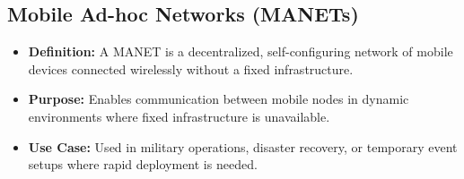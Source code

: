 \subsection{Mobile Ad-hoc Networks (MANETs)}
\begin{itemize}[leftmargin=1.5cm]
  \item \textbf{Definition:} A MANET is a decentralized, self-configuring network of mobile devices connected wirelessly without a fixed infrastructure.
  \item \textbf{Purpose:} Enables communication between mobile nodes in dynamic environments where fixed infrastructure is unavailable.
  \item \textbf{Use Case:} Used in military operations, disaster recovery, or temporary event setups where rapid deployment is needed.
\end{itemize}